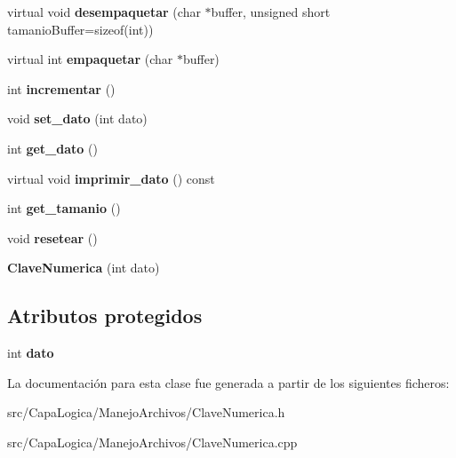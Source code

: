 \begin{DoxyCompactItemize}
\item 
\hypertarget{class_clave_numerica_aef63abffbeba54ef52d922d8226b57a5}{virtual void {\bfseries desempaquetar} (char $\ast$buffer, unsigned short tamanio\-Buffer=sizeof(int))}\label{class_clave_numerica_aef63abffbeba54ef52d922d8226b57a5}

\item 
\hypertarget{class_clave_numerica_a905ad9b39f2baffeebf3684a00a13061}{virtual int {\bfseries empaquetar} (char $\ast$buffer)}\label{class_clave_numerica_a905ad9b39f2baffeebf3684a00a13061}

\item 
\hypertarget{class_clave_numerica_a687668e839b3cc6da974eac0f38b197b}{int {\bfseries incrementar} ()}\label{class_clave_numerica_a687668e839b3cc6da974eac0f38b197b}

\item 
\hypertarget{class_clave_numerica_a3161a9ef83d664425f8fc99da07d4f65}{void {\bfseries set\-\_\-dato} (int dato)}\label{class_clave_numerica_a3161a9ef83d664425f8fc99da07d4f65}

\item 
\hypertarget{class_clave_numerica_a419b215e5819e6dcef28a97f83eb71f8}{int {\bfseries get\-\_\-dato} ()}\label{class_clave_numerica_a419b215e5819e6dcef28a97f83eb71f8}

\item 
\hypertarget{class_clave_numerica_abe25371957d214cd19593e692443f29a}{virtual void {\bfseries imprimir\-\_\-dato} () const }\label{class_clave_numerica_abe25371957d214cd19593e692443f29a}

\item 
\hypertarget{class_clave_numerica_a90e0b57488c43de70f769173277e5bd6}{int {\bfseries get\-\_\-tamanio} ()}\label{class_clave_numerica_a90e0b57488c43de70f769173277e5bd6}

\item 
\hypertarget{class_clave_numerica_af20b57c3c25a9ecafca53191dfa563ac}{void {\bfseries resetear} ()}\label{class_clave_numerica_af20b57c3c25a9ecafca53191dfa563ac}

\item 
\hypertarget{class_clave_numerica_a7073e8cfa3d6305c2125ea2be0dfabff}{{\bfseries \-Clave\-Numerica} (int dato)}\label{class_clave_numerica_a7073e8cfa3d6305c2125ea2be0dfabff}

\end{DoxyCompactItemize}
\subsection*{\-Atributos protegidos}
\begin{DoxyCompactItemize}
\item 
\hypertarget{class_clave_numerica_afbed35284fad7e79d3e65373c3854560}{int {\bfseries dato}}\label{class_clave_numerica_afbed35284fad7e79d3e65373c3854560}

\end{DoxyCompactItemize}


\-La documentación para esta clase fue generada a partir de los siguientes ficheros\-:\begin{DoxyCompactItemize}
\item 
src/\-Capa\-Logica/\-Manejo\-Archivos/\-Clave\-Numerica.\-h\item 
src/\-Capa\-Logica/\-Manejo\-Archivos/\-Clave\-Numerica.\-cpp\end{DoxyCompactItemize}
